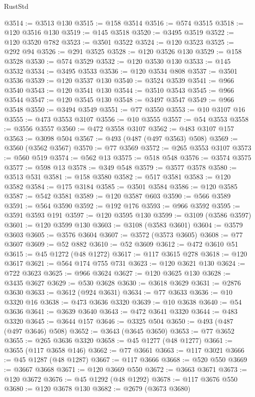 \begin{lexlean}{RustStd}
\begin{coremodule}
{\begin{coremodule}
{{{{{{{{{{{{{{{{{{{{{{{{{{{{{{{{{{{{{{{{{{{{{{{{{{{{{{{{{{{{@3514 := @3513 @130
@3515 := @158 @3514
@3516 := @574 @3515
@3518 := @120 @3516 @130
@3519 := @145 @3518
@3520 := @3495 @3519
@3522 := @120 @3520 @782
@3523 := @3501 @3522
@3524 := @120 @3523
@3525 := @292 @94
@3526 := @291 @3525
@3528 := @120 @3526 @130
@3529 := @158 @3528
@3530 := @574 @3529
@3532 := @120 @3530 @130
@3533 := @145 @3532
@3534 := @3495 @3533
@3536 := @120 @3534 @808
@3537 := @3501 @3536
@3539 := @120 @3537 @130
@3540 := @3524 @3539
@3541 := @966 @3540
@3543 := @120 @3541 @130
@3544 := @3510 @3543
@3545 := @966 @3544
@3547 := @120 @3545 @130
@3548 := @3497 @3547
@3549 := @966 @3548
@3550 := @3494 @3549
@3551 := @77 @3550
@3553 := @10 @3107 @16
@3555 := @473 @3553 @3107
@3556 := @10 @3555
@3557 := @54 @3553
@3558 := @3556 @3557
@3560 := @472 @3558 @3107
@3562 := @483 @3107 @157
@3563 := @3098 @504
@3567 := @493 (@487 (@497 @3563) @508)
@3569 := @3560 (@3562 @3567)
@3570 := @77 @3569
@3572 := @265 @3553 @3107
@3573 := @560 @519
@3574 := @562 @13
@3575 := @518 @548
@3576 := @3574 @3575
@3577 := @598 @13
@3578 := @349 @548
@3579 := @3577 @3578
@3580 := @3513 @531
@3581 := @158 @3580
@3582 := @517 @3581
@3583 := @120 @3582
@3584 := @175 @3184
@3585 := @3501 @3584
@3586 := @120 @3585
@3587 := @542 @3581
@3589 := @120 @3587 @603
@3590 := @566 @3589
@3591 := @564 @3590
@3592 := @192 @176
@3593 := @966 @3592
@3595 := @3591 @3593 @191
@3597 := @120 @3595 @130
@3599 := @3109 (@3586 @3597)
@3601 := @120 @3599 @130
@3603 := @3108 (@3583 @3601)
@3604 := @3579 @3603
@3605 := @3576 @3604
@3607 := @3572 (@3573 @3605)
@3608 := @77 @3607
@3609 := @52 @882
@3610 := @52 @3609
@3612 := @472 @3610 @51
@3615 := @45 @1272 (@48 @1272)
@3617 := @117 @3615 @278
@3618 := @120 @3617
@3621 := @564 @174 @755 @731
@3623 := @120 @3621 @130
@3624 := @722 @3623
@3625 := @966 @3624
@3627 := @120 @3625 @130
@3628 := @3435 @3627
@3629 := @530 @3628
@3630 := @3618 @3629
@3631 := @2876 @3630
@3633 := @3612 (@924 @3631)
@3634 := @77 @3633
@3636 := @10 @3320 @16
@3638 := @473 @3636 @3320
@3639 := @10 @3638
@3640 := @54 @3636
@3641 := @3639 @3640
@3643 := @472 @3641 @3320
@3644 := @483 @3320
@3645 := @3644 @157
@3646 := @3325 @504
@3650 := @493 (@487 (@497 @3646) @508)
@3652 := @3643 (@3645 @3650)
@3653 := @77 @3652
@3655 := @265 @3636 @3320
@3658 := @45 @1277 (@48 @1277)
@3661 := @3655 (@117 @3658 @146)
@3662 := @77 @3661
@3663 := @117 @3021
@3666 := @45 @1287 (@48 @1287)
@3667 := @117 @3666
@3668 := @520 @550
@3669 := @3667 @3668
@3671 := @120 @3669 @550
@3672 := @3663 @3671
@3673 := @120 @3672
@3676 := @45 @1292 (@48 @1292)
@3678 := @117 @3676 @550
@3680 := @120 @3678 @130
@3682 := @2679 (@3673 @3680)
}}}}}}}}}}}}}}}}}}}}}}}}}}}}}}}}}}}}}}}}}}}}}}}}}}}}}}}}}}}}
\end{coremodule}}
\end{coremodule}
\end{lexlean}
